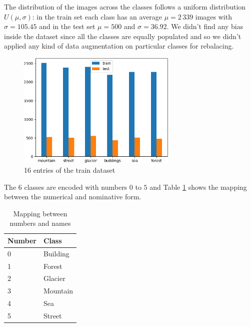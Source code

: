 \documentclass[compsoc]{IEEEtran}
\begin{document}
The distribution of the images across the classes follows a uniform distribution $U(\mu, \sigma)$: in the train set each class has an average $\mu = 2\,339$ images with $\sigma = 105.45$ and in the test set $\mu=500$ and $\sigma=36.92$. We didn't find any bias inside the dataset since all the classes are equally populated and so we didn't applied any kind of data augmentation on particular classes for rebalacing.


\begin{figure}[ht!]
\centering                                                                        
\includegraphics[width=3in]{../images/data.png}
\captionsetup{justification=centering}                                                                                         
\caption{16 entries of the train dataset}
\label{fig:data}                                                                                                                               
\end{figure}

The $6$ classes are encoded with numbers $0$ to $5$ and Table \ref{tab:encode} shows the mapping between the numerical and nominative form.



\begin{table}[ht!]
\centering
\begin{tabular}{|l|l|}
\hline
\rowcolor[HTML]{9698ED} 
{\color[HTML]{FFFFFF} \textbf{Number}} & {\color[HTML]{FFFFFF} \textbf{Class}} \\ \hline
0                                      & Building                              \\ \hline
1                                      & Forest                                \\ \hline
2                                      & Glacier                               \\ \hline
3                                      & Mountain                              \\ \hline
4                                      & Sea                                   \\ \hline
5                                      & Street                                \\ \hline
\end{tabular}
\caption{Mapping between numbers and names}
\label{tab:encode}
\end{table}
\end{document}
